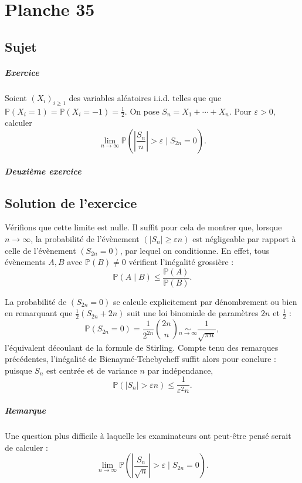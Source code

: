 \chapter{Planche 35}

\section{Sujet}

\paragraph{Exercice}
Soient $(X_i)_{i\geqslant 1}$ des variables aléatoires i.i.d. telles que que $\mathbb P(X_i = 1) = \mathbb P(X_i = -1) = \frac12.$
On pose $S_n = X_1 + \cdots + X_n$.
Pour $\varepsilon > 0$, calculer
\[
\lim_{n\to\infty} \mathbb P\left(\left|\frac{S_n}n\right| > \varepsilon \mid S_{2n} = 0\right).
\]

\paragraph{Deuxième exercice}

\section{Solution de l'exercice}
Vérifions que cette limite est nulle.
Il suffit pour cela de montrer que, lorsque $n \to \infty$, la probabilité de l'évènement $(|S_n| \geq \varepsilon n)$ est négligeable par rapport à celle de l'évènement $(S_{2n} = 0)$, par lequel on conditionne. En effet, tous évènements $A,B$ avec $\mathbb P(B) \neq 0$ vérifient l'inégalité grossière :
\[
\mathbb P(A \mid B) \leqslant \frac{\mathbb P(A)}{\mathbb P(B)}.
\]

La probabilité de $(S_{2n} = 0)$ se calcule explicitement par dénombrement ou bien en remarquant que $\frac12(S_{2n}+{2n})$ suit une loi binomiale de paramètres $2n$ et $\frac12$ :
\[
\mathbb P(S_{2n} = 0) = \frac1{2^{2n}}\binom{2n}{n} \underset{n\to\infty}{\sim} \frac 1{\sqrt{\pi n}},
\]
l'équivalent découlant de la formule de Stirling. Compte tenu des remarques précédentes, l'inégalité de Bienaymé-Tchebycheff suffit alors pour conclure : puisque $S_n$ est centrée et de variance $n$ par indépendance,
\[
 \mathbb P\left(|S_n| > \varepsilon n\right) \leqslant \frac{1}{\varepsilon^2 n}.
\]

\paragraph{Remarque}
Une question plus difficile à laquelle les examinateurs ont peut-être pensé serait de calculer :
\[
\lim_{n\to\infty} \mathbb P\left(\left|\frac{S_n}{\sqrt n}\right| > \varepsilon \mid S_{2n} = 0\right).
\]
